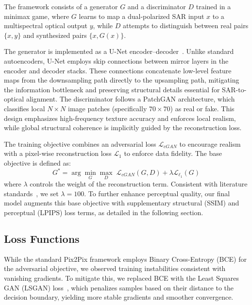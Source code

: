 The framework consists of a generator $G$ and a discriminator $D$ trained in a minimax game, where $G$ learns to map a dual-polarized SAR input $x$ to a multispectral optical output $y$, while $D$ attempts to distinguish between real pairs $\{x, y\}$ and synthesized pairs $\{x, G(x)\}$.

The generator is implemented as a U-Net encoder--decoder~\cite{U_net_2015}. Unlike standard autoencoders, U-Net employs skip connections between mirror layers in the encoder and decoder stacks. These connections concatenate low-level feature maps from the downsampling path directly to the upsampling path, mitigating the information bottleneck and preserving structural details essential for SAR-to-optical alignment. The discriminator follows a PatchGAN architecture, which classifies local $N \times N$ image patches (specifically $70 \times 70$) as real or fake. This design emphasizes high-frequency texture accuracy and enforces local realism, while global structural coherence is implicitly guided by the reconstruction loss.

The training objective combines an adversarial loss $\mathcal{L}_{cGAN}$ to encourage realism with a pixel-wise reconstruction loss $\mathcal{L}_{1}$ to enforce data fidelity. The base objective is defined as:
\begin{equation}
    G^* = \arg \min_G \max_D \; \mathcal{L}_{cGAN}(G,D) + \lambda \mathcal{L}_{\ell_1}(G)
\end{equation}
where $\lambda$ controls the weight of the reconstruction term. Consistent with literature standards~\cite{pix2pix_2018, A_cGAN_fuse_sar_MS_CR}, we set $\lambda = 100$. To further enhance perceptual quality, our final model augments this base objective with supplementary structural (SSIM) and perceptual (LPIPS) loss terms, as detailed in the following section.

\subsection{Loss Functions}
\label{subsec:losses}
While the standard Pix2Pix framework employs Binary Cross-Entropy (BCE) for the adversarial objective, we observed training instabilities consistent with vanishing gradients. To mitigate this, we replaced BCE with the Least Squares GAN (LSGAN) loss~\cite{ls_gan}, which penalizes samples based on their distance to the decision boundary, yielding more stable gradients and smoother convergence.

